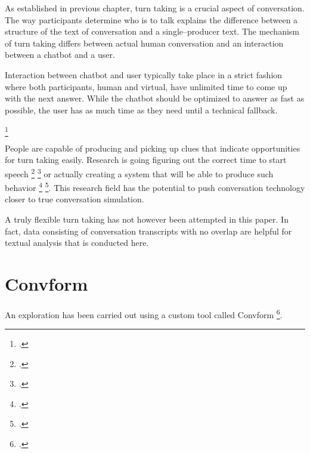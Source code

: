 \documentclass[12pt]{report}
\begin{document}
{\par
As established in previous chapter, turn taking is a crucial aspect of conversation.
The way participants determine who is to talk
explains the difference between
a structure of the text of conversation
and a single–producer text.
The mechanism of turn taking differs
between actual human conversation
and an interaction between a chatbot and a user.

Interaction between chatbot and user
typically take place in a strict fashion
where both participants,
human and virtual,
have unlimited time to come up with the next answer.
While the chatbot should be optimized to answer as fast as possible,
the user has as much time as they need until a technical fallback.

\par
{} \footcite{turntaking}

\par
People are capable of producing and picking up clues
that indicate opportunities for turn taking easily.
Research is going
figuring out the correct time to start speech \footcite{turntakingreview} \footcite{GRAVANO2011601}
or actually creating a system that will be able to produce such behavior \footcite{distributedturntaking} \footcite{Gervits2020Sigdial}.
This research field
has the potential to push conversation technology
closer to true conversation simulation.

\par
A truly flexible turn taking has not however been attempted in this paper.
In fact, data consisting of conversation transcripts with no overlap
are helpful for textual analysis that is conducted here.

\section{Convform}
\par
An exploration has been carried out using a custom tool called Convform \footcite{convform}.

}
\end{document}
